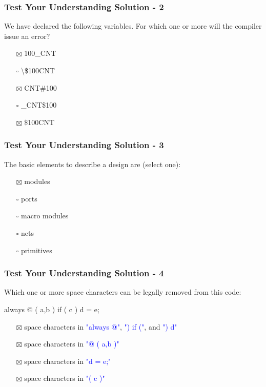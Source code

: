\documentclass[t, notes]{beamer}
\begin{document}
\begin{frame}
\frametitle{Test Your Understanding Solution - 2}

We have declared the following variables. For which one or more will the compiler issue an error?
\begin{itemize}
\item[$\boxtimes$] 100\_CNT
\item[$\square$] \textbackslash \$100CNT
\item[$\boxtimes$] CNT\#100
\item[$\square$] \_CNT\$100
\item[$\boxtimes$] \$100CNT
\end{itemize}

\end{frame}

\begin{frame}
\frametitle{Test Your Understanding Solution - 3}

The basic elements to describe a design are (select one):
\begin{itemize}
\item[$\boxtimes$] modules
\item[$\square$] ports
\item[$\square$] macro modules
\item[$\square$] nets
\item[$\square$] primitives
\end{itemize}

\end{frame}

\begin{frame}
\frametitle{Test Your Understanding Solution - 4}

Which one or more space characters can be legally removed from this code:

always @ ( a,b ) if ( c ) d = e;
\newline
\begin{itemize}
\item[$\boxtimes$] space characters in \textcolor{blue}{"always @"}, \textcolor{blue}{") if ("}, and \textcolor{blue}{") d"}
\item[$\boxtimes$] space characters in \textcolor{blue}{"@ ( a,b )"}
\item[$\boxtimes$] space characters in \textcolor{blue}{"d = e;"}
\item[$\boxtimes$] space characters in \textcolor{blue}{"( c )"}
\end{itemize}

\end{frame}
\end{document}
